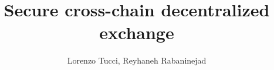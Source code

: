\documentclass{article}      	%
\begin{document}
         
\author{Lorenzo Tucci, Reyhaneh Rabaninejad}
\title{Secure cross-chain decentralized exchange}

\maketitle

\tableofcontents
\newpage

\begin{todobox}

\end{todobox}








\printbibliography
\end{document}
